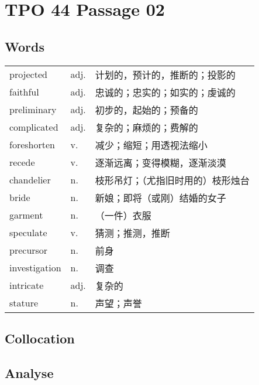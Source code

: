 \section{TPO 44 Passage 02}

\subsection{Words}

\begin{tabular}{lll}
    projected     & adj. & 计划的，预计的，推断的；投影的   \\
    faithful      & adj. & 忠诚的；忠实的；如实的；虔诚的   \\
    preliminary   & adj. & 初步的，起始的；预备的       \\
    complicated   & adj. & 复杂的；麻烦的；费解的       \\
    foreshorten   & v.   & 减少；缩短；用透视法缩小      \\
    recede        & v.   & 逐渐远离；变得模糊，逐渐淡漠    \\
    chandelier    & n.   & 枝形吊灯；（尤指旧时用的）枝形烛台 \\
    bride         & n.   & 新娘；即将（或刚）结婚的女子    \\
    garment       & n.   & （一件）衣服            \\
    speculate     & v.   & 猜测；推测，推断          \\
    precursor     & n.   & 前身                \\
    investigation & n.   & 调查                \\
    intricate     & adj. & 复杂的               \\
    stature       & n.   & 声望；声誉             \\
\end{tabular}

\subsection{Collocation}


\subsection{Analyse}

